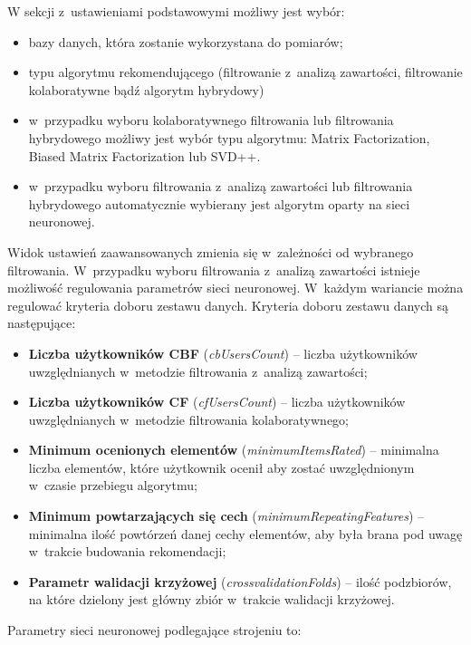 \documentclass[twoside]{iisthesis}
\begin{document}
		W sekcji z~ustawieniami podstawowymi możliwy jest wybór:
		\begin{itemize}
			\item bazy danych, która zostanie wykorzystana do pomiarów;
			\item typu algorytmu rekomendującego (filtrowanie z~analizą zawartości, filtrowanie kolaboratywne bądź algorytm hybrydowy)
			\item w~przypadku wyboru kolaboratywnego filtrowania lub filtrowania hybrydowego możliwy jest wybór typu algorytmu: Matrix Factorization, Biased Matrix Factorization lub SVD++.
			\item w~przypadku wyboru filtrowania z~analizą zawartości lub filtrowania hybrydowego automatycznie wybierany jest algorytm oparty na sieci neuronowej. 
		\end{itemize}
		 
		 Widok ustawień zaawansowanych zmienia się w~zależności od wybranego filtrowania. W~przypadku wyboru filtrowania z~analizą zawartości istnieje możliwość regulowania parametrów sieci neuronowej. W~każdym wariancie można regulować kryteria doboru zestawu danych. Kryteria doboru zestawu danych są następujące:
		 
		 \begin{itemize}
		 	\item \textbf{Liczba użytkowników CBF} (\textit{cbUsersCount}) -- liczba użytkowników uwzględnianych w~metodzie filtrowania z~analizą zawartości;
		 	\item \textbf{Liczba użytkowników CF} (\textit{cfUsersCount}) -- liczba użytkowników uwzględnianych w~metodzie filtrowania kolaboratywnego;
		 	\item \textbf{Minimum ocenionych elementów} (\textit{minimumItemsRated}) -- minimalna liczba elementów, które użytkownik ocenił aby zostać uwzględnionym w~czasie przebiegu algorytmu;
		 	\item \textbf{Minimum powtarzających się cech} (\textit{minimumRepeatingFeatures}) -- minimalna ilość powtórzeń danej cechy elementów, aby była brana pod uwagę w~trakcie budowania rekomendacji;
		 	\item \textbf{Parametr walidacji krzyżowej} (\textit{crossvalidationFolds}) -- ilość podzbiorów, na które dzielony jest główny zbiór w~trakcie walidacji krzyżowej. 
		 \end{itemize}
		 
		 Parametry sieci neuronowej podlegające strojeniu to:
\end{document}
